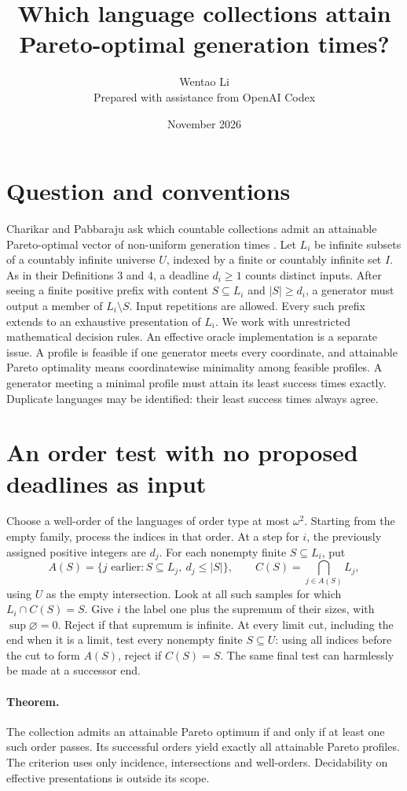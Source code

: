 \documentclass[11pt]{article}
\title{Which language collections attain Pareto-optimal generation times?}
\author{Wentao Li\\[2pt]\small Prepared with assistance from OpenAI Codex}
\date{November 2026}
\begin{document}
\maketitle
\section{Question and conventions}
Charikar and Pabbaraju ask which countable collections admit an attainable Pareto-optimal vector of non-uniform generation times \cite[Introduction and \S3.4]{cp}. Let $L_i$ be infinite subsets of a countably infinite universe $U$, indexed by a finite or countably infinite set $I$. As in their Definitions 3 and 4, a deadline $d_i\ge1$ counts distinct inputs. After seeing a finite positive prefix with content $S\subseteq L_i$ and $|S|\ge d_i$, a generator must output a member of $L_i\setminus S$. Input repetitions are allowed. Every such prefix extends to an exhaustive presentation of $L_i$. We work with unrestricted mathematical decision rules. An effective oracle implementation is a separate issue. A profile is feasible if one generator meets every coordinate, and attainable Pareto optimality means coordinatewise minimality among feasible profiles. A generator meeting a minimal profile must attain its least success times exactly. Duplicate languages may be identified: their least success times always agree.

\section{An order test with no proposed deadlines as input}
Choose a well-order of the languages of order type at most $\omega^2$. Starting from the empty family, process the indices in that order. At a step for $i$, the previously assigned positive integers are $d_j$. For each nonempty finite $S\subseteq L_i$, put
\[
 A(S)=\{j\text{ earlier}: S\subseteq L_j,\ d_j\le |S|\},\qquad
 C(S)=\bigcap_{j\in A(S)} L_j,
\]
using $U$ as the empty intersection. Look at all such samples for which $L_i\cap C(S)=S$. Give $i$ the label one plus the supremum of their sizes, with $\sup\varnothing=0$. Reject if that supremum is infinite. At every limit cut, including the end when it is a limit, test every nonempty finite $S\subseteq U$: using all indices before the cut to form $A(S)$, reject if $C(S)=S$. The same final test can harmlessly be made at a successor end.

\paragraph{Theorem.} The collection admits an attainable Pareto optimum if and only if at least one such order passes. Its successful orders yield exactly all attainable Pareto profiles. The criterion uses only incidence, intersections and well-orders. Decidability on effective presentations is outside its scope.
\end{document}
